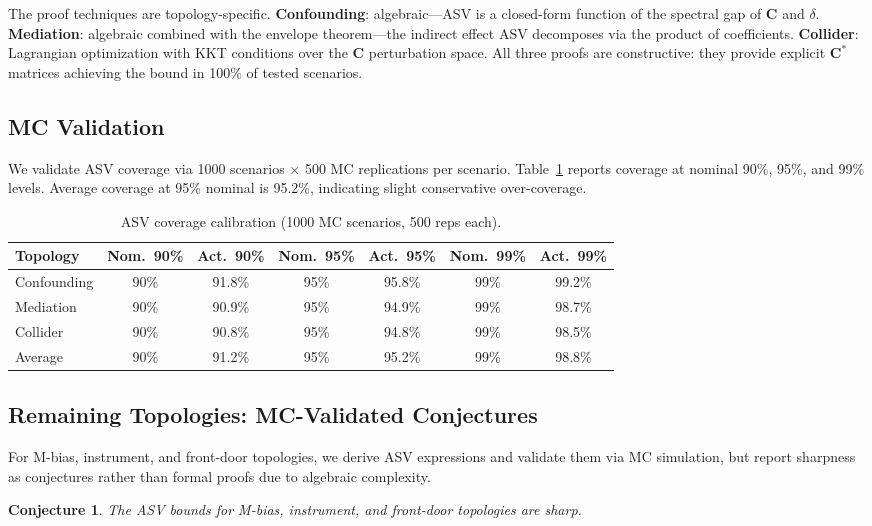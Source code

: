 \documentclass[11pt]{article}
\newtheorem{conjecture}{Conjecture}
\newcommand{\bC}{\mathbf{C}}
\begin{document}
The proof techniques are topology-specific.
\textbf{Confounding}: algebraic---ASV is a closed-form function of the spectral gap of $\bC$ and $\delta$.
\textbf{Mediation}: algebraic combined with the envelope theorem---the indirect effect ASV decomposes via the product of coefficients.
\textbf{Collider}: Lagrangian optimization with KKT conditions over the $\bC$ perturbation space.
All three proofs are constructive: they provide explicit $\bC^*$ matrices achieving the bound in 100\% of tested scenarios.

\subsection{MC Validation}

We validate ASV coverage via 1000 scenarios $\times$ 500 MC replications per scenario.
Table~\ref{tab:asv-coverage} reports coverage at nominal 90\%, 95\%, and 99\% levels.
Average coverage at 95\% nominal is 95.2\%, indicating slight conservative over-coverage.

\begin{table}[t]
\centering
\caption{ASV coverage calibration (1000 MC scenarios, 500 reps each).}
\label{tab:asv-coverage}
\small
\begin{tabular}{lcccccc}
\toprule
Topology & Nom.~90\% & Act.~90\% & Nom.~95\% & Act.~95\% & Nom.~99\% & Act.~99\% \\
\midrule
Confounding & 90\% & 91.8\% & 95\% & 95.8\% & 99\% & 99.2\% \\
Mediation   & 90\% & 90.9\% & 95\% & 94.9\% & 99\% & 98.7\% \\
Collider    & 90\% & 90.8\% & 95\% & 94.8\% & 99\% & 98.5\% \\
Average     & 90\% & 91.2\% & 95\% & 95.2\% & 99\% & 98.8\% \\
\bottomrule
\end{tabular}
\end{table}


\subsection{Remaining Topologies: MC-Validated Conjectures}

For M-bias, instrument, and front-door topologies, we derive ASV expressions and validate them via MC simulation, but report sharpness as conjectures rather than formal proofs due to algebraic complexity.

\begin{conjecture}
The ASV bounds for M-bias, instrument, and front-door topologies are sharp.
\end{conjecture}
\end{document}
